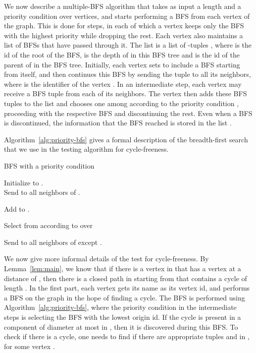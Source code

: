 \documentclass[11pt]{article}
\begin{document}
We now describe a multiple-BFS algorithm that takes as input a length  and a priority condition  over vertices, and starts performing a BFS from each vertex of the graph. This is done for  steps, in each of which a vertex keeps only the BFS with the highest priority while dropping the rest. Each vertex also
maintains a list  of BFSs that have passed through it. The list  is a
list of -tuples , where  is the id of the root of the BFS,  is the
depth of  in this BFS tree and  is the id of the parent of  in the BFS
tree. Initially, each vertex  sets  to include a BFS starting from itself, and then continues this BFS by sending
the tuple  to all its neighbors, where  is the identifier of the vertex .
In an intermediate step, each vertex  may receive a BFS tuple from each of its neighbors. The vertex 
then adds these BFS tuples to the list  and chooses one among  according to the
priority condition , proceeding with the respective BFS and discontinuing the rest. Even when
a BFS is discontinued, the information that the BFS reached  is stored in the list .

Algorithm~\ref{alg:priority-bfs} gives a formal description of the breadth-first search that we
use in the testing algorithm for cycle-freeness.

\begin{algorithm}[htbp]
  \caption{BFS with a priority condition\label{alg:priority-bfs}}
    {
Initialize  to .\\
      Send  to all neighbors of .
    }
    {
      {
	{
	  Add  to .

	  Select  from  according to  over 

	  Send  to all neighbors of  except .
        }
      }
    }
\end{algorithm}


We now give more informal details of the test for cycle-freeness. By Lemma~\ref{lem:main}, we
know that if there is a vertex  in  that has a vertex  at a distance of , then there is a closed path in  starting from  that contains a cycle of length
. In the first part, each vertex gets its name as its vertex id, and performs a
BFS on the graph  in the hope of finding a cycle. The BFS is performed using
Algorithm~\ref{alg:priority-bfs}, where the priority condition in the intermediate steps is
selecting the BFS with the lowest origin id. If the cycle is present in a component of diameter at
most  in , then it is discovered during this BFS. To check if there is a
cycle, one needs to find if there are appropriate tuples  and
 in , for some vertex .
\end{document}
